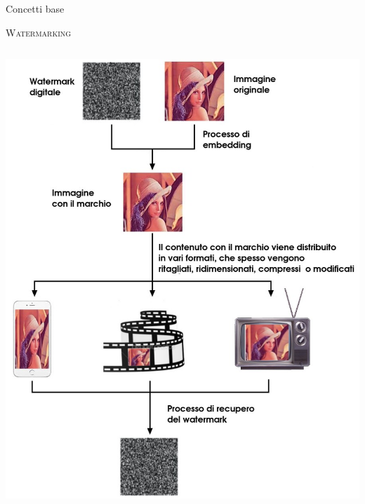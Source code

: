\documentclass{beamer}
\begin{document}
\begin{section}{Concetti base}
\begin{frame}[t]{\textsc{Watermarking}}
\begin{columns}
\begin{column}{5cm}
\includegraphics[width=1.1\linewidth]{./img/wat_workflow.jpg}
\end{column}
\end{columns}
\end{frame}


\end{section}
\end{document}
